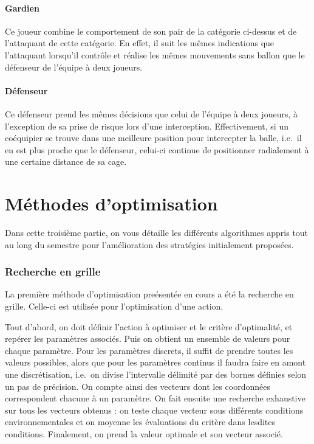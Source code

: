 \documentclass[12pt,a4paper]{article}
\begin{document}
\subsection*{Gardien}
Ce joueur combine le comportement de son pair de la cat\'egorie ci-dessus et de 
l'attaquant de cette cat\'egorie. En effet, il suit les m\^emes indications que 
l'attaquant lorsqu'il contr\^ole et r\'ealise les m\^emes mouvements sans ballon 
que le d\'efenseur de l'\'equipe \`a deux joueurs.

\subsection*{D\'efenseur}
Ce d\'efenseur prend les m\^emes d\'ecisions que celui de l'\'equipe \`a 
deux joueurs, \`a l'exception de sa prise de risque lors d'une interception. 
Effectivement, si un co\'equipier se trouve dans une meilleure position pour 
intercepter la balle, i.e.\ il en est plus proche que le d\'efenseur, celui-ci 
continue de positionner radialement \`a une certaine distance de sa cage.

\newpage

\part{M\'ethodes d'optimisation}
Dans cette troisi\`eme partie, on vous d\'etaille les diff\'erents algorithmes 
appris tout au long du semestre pour l'am\'elioration des strat\'egies 
initialement propos\'ees.

\section{Recherche en grille}
La premi\`ere m\'ethode d'optimisation pre\'esent\'ee en cours a \'et\'e la 
recherche en grille. Celle-ci est utilis\'ee pour l'optimisation d'une 
action.

Tout d'abord, on doit d\'efinir l'action \`a optimiser et le crit\`ere 
d'optimalit\'e, et rep\'erer les param\`etres associ\'es. Puis on 
obtient un ensemble de valeurs pour chaque param\`etre. 
Pour les param\`etres discrets, il suffit de prendre toutes les valeurs 
possibles, alors que pour les param\`etres continus il faudra faire en amont 
une discr\'etisation, i.e.\ on divise l'intervalle d\'elimit\'e par des bornes 
d\'efinies selon un pas de pr\'ecision. On compte ainsi des vecteurs dont les 
coordonn\'ees correspondent chacune \`a un param\`etre. On fait ensuite une 
recherche exhaustive sur tous les vecteurs obtenus : on teste chaque vecteur 
sous diff\'erents conditions environnementales et on moyenne les \'evaluations 
 du crit\`ere dans lesdites conditions. Finalement, on prend la valeur optimale 
et son vecteur associ\'e.
\end{document}
